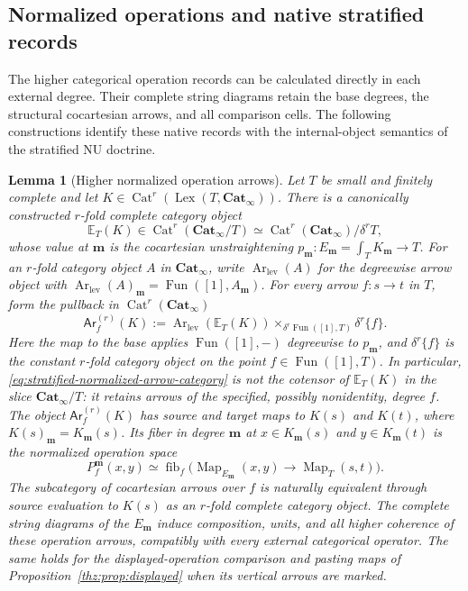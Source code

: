 \documentclass[oneside]{article}
\theoremstyle{plain}
\newtheorem{lemma}[theorem]{Lemma}
\theoremstyle{definition}
\theoremstyle{remark}
\newcommand{\Cat}{\mathbf{Cat}_{\infty}}
\newcommand{\Fun}{\operatorname{Fun}}
\newcommand{\Lex}{\operatorname{Lex}}
\newcommand{\Map}{\operatorname{Map}}
\newcommand{\fib}{\operatorname{fib}}
\begin{document}
\subsection{Normalized operations and native stratified records}

The higher categorical operation records can be calculated directly in
each external degree. Their complete string diagrams retain the base
degrees, the structural cocartesian arrows, and all comparison cells.
The following constructions identify these native records with the
internal-object semantics of the stratified NU doctrine.

\begin{lemma}[Higher normalized operation arrows]
\label{lem:stratified-normalized-operations}
Let $T$ be small and finitely complete and let
$K\in\operatorname{Cat}^r(\Lex(T,\Cat))$.  There is a canonically
constructed $r$-fold complete category object
\[
 \mathbb E_T(K)\in\operatorname{Cat}^r(\Cat/T)
 \simeq
 \operatorname{Cat}^r(\Cat)/\delta^r T,
\]
whose value at $\mathbf m$ is the cocartesian unstraightening
$p_{\mathbf m}:E_{\mathbf m}=\int_TK_{\mathbf m}\to T$.
For an $r$-fold category object $A$ in $\Cat$, write
$\operatorname{Ar}_{\mathrm{lev}}(A)$ for the degreewise arrow
object with
$\operatorname{Ar}_{\mathrm{lev}}(A)_{\mathbf m}
 =\Fun([1],A_{\mathbf m})$.
For every arrow $f:s\to t$ in $T$, form the pullback \emph{in}
$\operatorname{Cat}^r(\Cat)$
\begin{equation}\label{eq:stratified-normalized-arrow-category}
 \mathsf{Ar}^{(r)}_f(K):=
 \operatorname{Ar}_{\mathrm{lev}}(\mathbb E_T(K))
 \times_{\delta^r\Fun([1],T)}\delta^r\{f\}.
\end{equation}
Here the map to the base applies $\Fun([1],-)$ degreewise to
$p_{\mathbf m}$, and $\delta^r\{f\}$ is the constant
$r$-fold category object on the point $f\in\Fun([1],T)$.
In particular, \eqref{eq:stratified-normalized-arrow-category} is
\emph{not} the cotensor of $\mathbb E_T(K)$ in the slice $\Cat/T$:
it retains arrows of the specified, possibly nonidentity, degree $f$.
The object $\mathsf{Ar}^{(r)}_f(K)$ has source and target maps to
$K(s)$ and $K(t)$, where $K(s)_{\mathbf m}=K_{\mathbf m}(s)$.
Its fiber in degree $\mathbf m$ at
$x\in K_{\mathbf m}(s)$ and $y\in K_{\mathbf m}(t)$ is
the normalized operation space
\[
 P^{\mathbf m}_f(x,y)
 \simeq\fib_f\bigl(\Map_{E_{\mathbf m}}(x,y)
                  \longrightarrow\Map_T(s,t)\bigr).
\]
The subcategory of cocartesian arrows over $f$ is naturally equivalent
through source evaluation to $K(s)$ as an $r$-fold complete category
object.  The complete string diagrams of the $E_{\mathbf m}$ induce
composition, units, and all higher coherence of these operation arrows,
compatibly with every external categorical operator.  The same holds
for the displayed-operation comparison and pasting maps of
Proposition~\ref{thz:prop:displayed} when its vertical arrows are marked.
\end{lemma}
\end{document}
